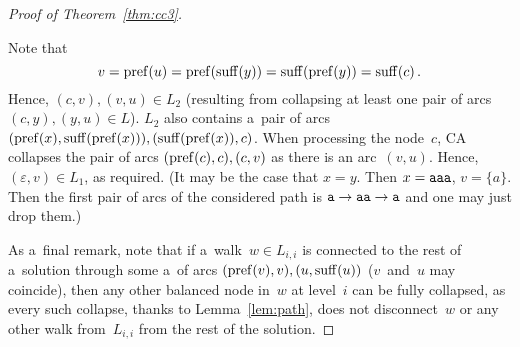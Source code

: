 \begin{proof}[Proof of Theorem~\ref{thm:cc3}]
\begin{description}
Note that 
\[v = \operatorname{pref}(u)=\operatorname{pref}(\operatorname{suff}(y))=\operatorname{suff}(\operatorname{pref}(y))=\operatorname{suff}(c) \, .\]
Hence, $(c,v), (v,u) \in L_2$ (resulting from collapsing at least one pair of arcs $(c,y), (y,u) \in L$). $L_2$ also contains a~pair of arcs $(\operatorname{pref}(x), \operatorname{suff}(\operatorname{pref}(x))), (\operatorname{suff}(\operatorname{pref}(x)), c)$. When processing the node~$c$, CA collapses the pair of arcs $(\operatorname{pref}(c), c), (c, v)$ as there is an arc~$(v,u)$.
Hence, $(\varepsilon, v) \in L_1$, as required. (It may be the case that $x=y$. Then $x={\tt aaa}$, $v=\{a\}$. Then the first pair of arcs of the considered path is ${\tt a} \to {\tt aa} \to {\tt a}$ and one may just drop them.)
\end{description}

As a~final remark, note that if a~walk~$w \in L_{i,i}$ is connected to the rest of a~solution through some a~of arcs $(\operatorname{pref}(v), v), (u, \operatorname{suff}(u))$ ($v$~and~$u$ may coincide), then any other balanced node in~$w$ at level~$i$ can be fully collapsed, as every such collapse, thanks to Lemma~\ref{lem:path}, does not disconnect~$w$ or any other walk from~$L_{i,i}$ from the rest of the solution.



\end{proof}

